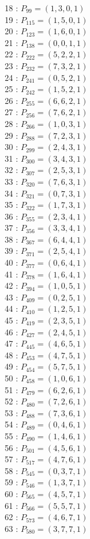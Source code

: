 \documentclass{article}
\begin{document}
{\begin{multicols}{2}
18 : $P_{99}=( 1, 3, 0, 1 )$\\
19 : $P_{115}=( 1, 5, 0, 1 )$\\
20 : $P_{123}=( 1, 6, 0, 1 )$\\
21 : $P_{138}=( 0, 0, 1, 1 )$\\
22 : $P_{222}=( 5, 2, 2, 1 )$\\
23 : $P_{232}=( 7, 3, 2, 1 )$\\
24 : $P_{241}=( 0, 5, 2, 1 )$\\
25 : $P_{242}=( 1, 5, 2, 1 )$\\
26 : $P_{255}=( 6, 6, 2, 1 )$\\
27 : $P_{256}=( 7, 6, 2, 1 )$\\
28 : $P_{266}=( 1, 0, 3, 1 )$\\
29 : $P_{288}=( 7, 2, 3, 1 )$\\
30 : $P_{299}=( 2, 4, 3, 1 )$\\
31 : $P_{300}=( 3, 4, 3, 1 )$\\
32 : $P_{307}=( 2, 5, 3, 1 )$\\
33 : $P_{320}=( 7, 6, 3, 1 )$\\
34 : $P_{321}=( 0, 7, 3, 1 )$\\
35 : $P_{322}=( 1, 7, 3, 1 )$\\
36 : $P_{355}=( 2, 3, 4, 1 )$\\
37 : $P_{356}=( 3, 3, 4, 1 )$\\
38 : $P_{367}=( 6, 4, 4, 1 )$\\
39 : $P_{371}=( 2, 5, 4, 1 )$\\
40 : $P_{377}=( 0, 6, 4, 1 )$\\
41 : $P_{378}=( 1, 6, 4, 1 )$\\
42 : $P_{394}=( 1, 0, 5, 1 )$\\
43 : $P_{409}=( 0, 2, 5, 1 )$\\
44 : $P_{410}=( 1, 2, 5, 1 )$\\
45 : $P_{419}=( 2, 3, 5, 1 )$\\
46 : $P_{427}=( 2, 4, 5, 1 )$\\
47 : $P_{445}=( 4, 6, 5, 1 )$\\
48 : $P_{453}=( 4, 7, 5, 1 )$\\
49 : $P_{454}=( 5, 7, 5, 1 )$\\
50 : $P_{458}=( 1, 0, 6, 1 )$\\
51 : $P_{479}=( 6, 2, 6, 1 )$\\
52 : $P_{480}=( 7, 2, 6, 1 )$\\
53 : $P_{488}=( 7, 3, 6, 1 )$\\
54 : $P_{489}=( 0, 4, 6, 1 )$\\
55 : $P_{490}=( 1, 4, 6, 1 )$\\
56 : $P_{501}=( 4, 5, 6, 1 )$\\
57 : $P_{517}=( 4, 7, 6, 1 )$\\
58 : $P_{545}=( 0, 3, 7, 1 )$\\
59 : $P_{546}=( 1, 3, 7, 1 )$\\
60 : $P_{565}=( 4, 5, 7, 1 )$\\
61 : $P_{566}=( 5, 5, 7, 1 )$\\
62 : $P_{573}=( 4, 6, 7, 1 )$\\
63 : $P_{580}=( 3, 7, 7, 1 )$\\
\end{multicols}
}
\end{document}
